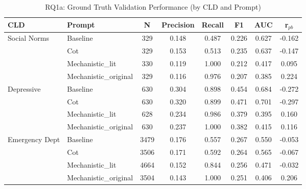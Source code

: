 \begin{table}[htbp]
\centering
\caption{RQ1a: Ground Truth Validation Performance (by CLD and Prompt)}
\label{tab:rq1a_gt_main}
\begin{tabular}{llcccccc}
\toprule
\textbf{CLD} & \textbf{Prompt} & \textbf{N} & \textbf{Precision} & \textbf{Recall} & \textbf{F1} & \textbf{AUC} & \textbf{r$_{pb}$} \\
\midrule
Social Norms & Baseline & 329 & 0.148 & 0.487 & 0.226 & 0.627 & -0.162 \\
 & Cot & 329 & 0.153 & 0.513 & 0.235 & 0.637 & -0.147 \\
 & Mechanistic_lit & 330 & 0.119 & 1.000 & 0.212 & 0.417 & 0.095 \\
 & Mechanistic_original & 329 & 0.116 & 0.976 & 0.207 & 0.385 & 0.224 \\
\midrule
Depressive & Baseline & 630 & 0.304 & 0.898 & 0.454 & 0.684 & -0.272 \\
 & Cot & 630 & 0.320 & 0.899 & 0.471 & 0.701 & -0.297 \\
 & Mechanistic_lit & 628 & 0.234 & 0.986 & 0.379 & 0.395 & 0.160 \\
 & Mechanistic_original & 630 & 0.237 & 1.000 & 0.382 & 0.415 & 0.116 \\
\midrule
Emergency Dept & Baseline & 3479 & 0.176 & 0.557 & 0.267 & 0.550 & -0.053 \\
 & Cot & 3506 & 0.171 & 0.592 & 0.264 & 0.565 & -0.067 \\
 & Mechanistic_lit & 4664 & 0.152 & 0.844 & 0.256 & 0.471 & -0.032 \\
 & Mechanistic_original & 3504 & 0.143 & 1.000 & 0.251 & 0.406 & 0.206 \\
\midrule
\bottomrule
\end{tabular}
\end{table}